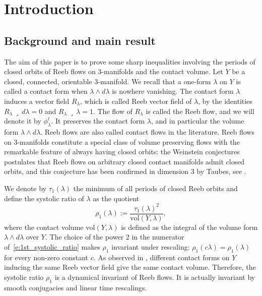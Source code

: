 \documentclass[11pt]{article}
\numberwithin{equation}{section}
\theoremstyle{definition}
\newcommand{\vol}{\mathrm{vol}}
\let\diff d
\begin{document}
\section{Introduction}
\label{s:introduction}

\subsection{Background and main result}
The aim of this paper is to prove some sharp inequalities involving the periods of closed orbits of Reeb flows on $3$-manifolds and the contact volume.
Let $Y$ be a closed, connected, orientable $3$-manifold. We recall that a one-form $\lambda$ on $Y$ is called a contact form when $\lambda\wedge d\lambda$ is nowhere vanishing. The contact form $\lambda$ induces a vector field $R_{\lambda}$, which is called Reeb vector field of $\lambda$, by the identities $R_{\lambda} \,\lrcorner\, \diff\lambda = 0$ and $R_{\lambda} \,\lrcorner\, \lambda=1$.
The flow of $R_{\lambda}$ is called the Reeb flow, and we will denote it by $\phi_{\lambda}^t$. It preserves the contact form $\lambda$, and in particular the volume form $\lambda\wedge d\lambda$. Reeb flows are also called contact flows in the literature. Reeb flows on $3$-manifolds constitute a special class of volume preserving flows with the remarkable feature of always having closed orbits: the Weinstein conjectures postulates that Reeb flows on arbitrary closed contact manifolds admit closed orbits, and this conjecture has been confirmed in dimension $3$ by Taubes, see \cite{Taubes:2007wi}.

We denote by $\tau_1(\lambda)$ the minimum of all periods of closed Reeb orbits and define the systolic ratio of $\lambda$ as the quotient
\begin{equation}
\label{e:1st_systolic_ratio}
\rho_1(\lambda) := \frac{\tau_1(\lambda)^2}{\vol(Y,\lambda)},
\end{equation}
where the contact volume $\vol(Y,\lambda)$ is defined as the integral of the volume form $\lambda\wedge \diff\lambda$ over $Y$. The choice of the power 2 in the numerator of~\eqref{e:1st_systolic_ratio} makes $\rho_1$ invariant under rescaling: $\rho_1(c\lambda) = \rho_1(\lambda)$ for every non-zero constant $c$. As observed in \cite[Lem.\,2.1]{Croke:1994}, different contact forms on $Y$ inducing the same Reeb vector field give the same contact volume. Therefore, the systolic ratio $\rho_1$ is a dynamical invariant of Reeb flows. It is actually invariant by smooth conjugacies and linear time rescalings.
\end{document}
